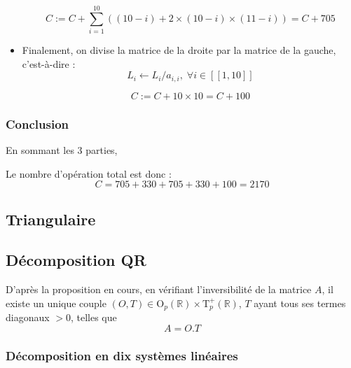 \documentclass{article}
\begin{document}
\begin{itemize}
        \begin{tcolorbox}
        \[
        C := C + \sum_{i=1}^{10} ((10-i) + 2 \times  (10-i) \times  (11-i)) = C + 705
    \]
        \end{tcolorbox}
        
    \item Finalement, on divise la matrice de la droite par la matrice de la gauche, c'est-à-dire : $$L_i \leftarrow L_i / a_{i,i}, \; \forall i \in [\![1, 10]\!]$$
        
        \begin{tcolorbox}
        \[
        C := C + 10 \times 10 = C + 100
        \]
        \end{tcolorbox}
        

\end{itemize}

\subsubsection{Conclusion}

En sommant les 3 parties, 

\begin{tcolorbox}[title={Conclusion}, fonttitle = \bfseries \sffamily]
    Le nombre d'opération total est donc :
    \[
    C = 705 + 330  + 705 + 330 + 100 = 2170
    \]
    
\end{tcolorbox}

\newpage

\subsection{Triangulaire}\label{3}

\newpage

\subsection{Décomposition QR}




D'après la proposition en cours, en vérifiant l'inversibilité de la matrice $A$, il existe un unique couple $(O, T) \in \mathrm{O} _p(\mathbb{R} ) \times  \mathrm{T} _p^+ (\mathbb{R})$, $T$ ayant tous ses termes diagonaux $>0$, telles que \[
A = O.T
\]

\subsubsection{Décomposition en dix systèmes linéaires}
\end{document}
